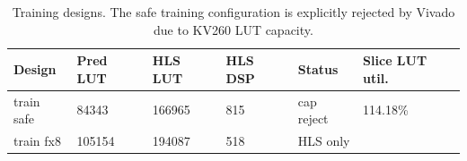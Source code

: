 \begin{table}[t]
\centering
\scriptsize
\setlength{\tabcolsep}{3pt}
\begin{tabular}{llllll}
\hline
Design & Pred LUT & HLS LUT & HLS DSP & Status & Slice LUT util. \\
\hline
train safe & 84343 & 166965 & 815 & cap reject & 114.18\% \\
train fx8 & 105154 & 194087 & 518 & HLS only &  \\
\hline
\end{tabular}
\caption{Training designs. The safe training configuration is explicitly rejected by Vivado due to KV260 LUT capacity.}
\label{tab:table\_arxiv\_training\_capacity}
\end{table}
